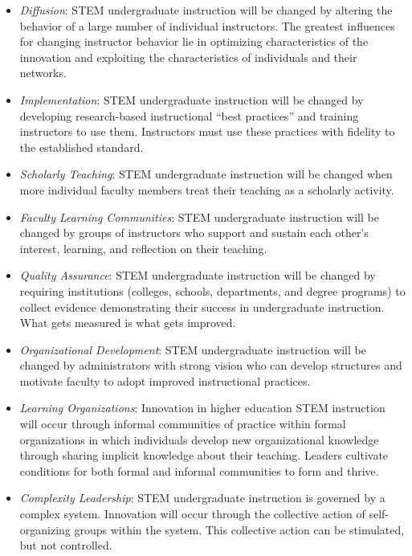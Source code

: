 \begin{itemize}
\item
  \emph{Diffusion}: STEM undergraduate instruction will be changed by
  altering the behavior of a large number of individual instructors. The
  greatest influences for changing instructor behavior lie in optimizing
  characteristics of the innovation and exploiting the characteristics
  of individuals and their networks.
\item
  \emph{Implementation}: STEM undergraduate instruction will be changed
  by developing research-based instructional ``best practices'' and
  training instructors to use them. Instructors must use these practices
  with fidelity to the established standard.
\item
  \emph{Scholarly Teaching}: STEM undergraduate instruction will be
  changed when more individual faculty members treat their teaching as a
  scholarly activity.
\item
  \emph{Faculty Learning Communities}: STEM undergraduate instruction
  will be changed by groups of instructors who support and sustain each
  other's interest, learning, and reflection on their teaching.
\item
  \emph{Quality Assurance}: STEM undergraduate instruction will be
  changed by requiring institutions (colleges, schools, departments, and
  degree programs) to collect evidence demonstrating their success in
  undergraduate instruction. What gets measured is what gets improved.
\item
  \emph{Organizational Development}: STEM undergraduate instruction will
  be changed by administrators with strong vision who can develop
  structures and motivate faculty to adopt improved instructional
  practices.
\item
  \emph{Learning Organizations}: Innovation in higher education STEM
  instruction will occur through informal communities of practice within
  formal organizations in which individuals develop new organizational
  knowledge through sharing implicit knowledge about their teaching.
  Leaders cultivate conditions for both formal and informal communities
  to form and thrive.
\item
  \emph{Complexity Leadership}: STEM undergraduate instruction is
  governed by a complex system. Innovation will occur through the
  collective action of self-organizing groups within the system. This
  collective action can be stimulated, but not controlled.
\end{itemize}

